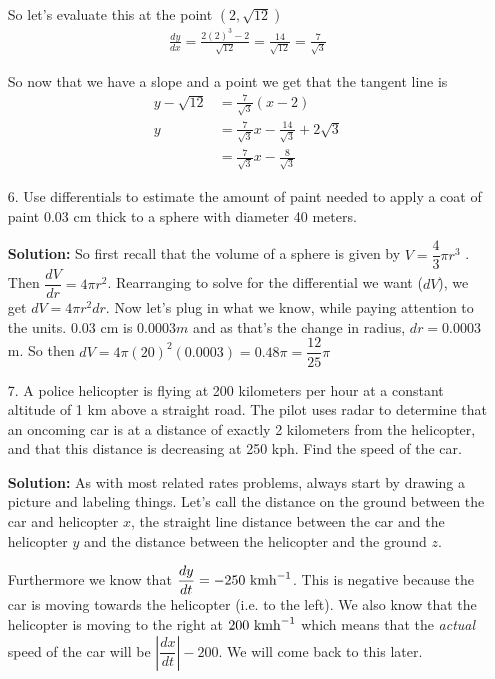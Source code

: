 \documentclass[11pt,reqno]{article}
\theoremstyle{definition}
\begin{document}
\begin{enumerate}
		So let's evaluate this at the point $(2, \sqrt{12})$ 
		\begin{align*}
			\frac{dy}{dx} = \frac{2 (2)^3 - 2}{\sqrt{12}} = \frac{14}{\sqrt{12}} = \frac{7}{\sqrt{3}}
		\end{align*}
		
		So now that we have a slope and a point we get that the tangent line is
		\begin{align*}
			y - \sqrt{12} &= \frac{7}{\sqrt{3}} (x - 2) \\
			y &= \frac{7}{\sqrt{3}} x - \frac{14}{\sqrt{3}} + 2\sqrt{3} \\
			  &= \frac{7}{\sqrt{3}} x -\frac{8}{\sqrt{3}}
		\end{align*}
		
		\item[6.] Use differentials to estimate the amount of paint needed to apply a coat of paint 0.03 cm thick to a sphere with diameter 40 meters.
		
		\textbf{Solution:} So first recall that the volume of a sphere is given by $V = \dfrac{4}{3} \pi r^3$ . Then $\dfrac{dV}{dr} = 4 \pi r^2$. Rearranging to solve for the differential we want ($dV$), we get $dV = 4 \pi r^2 dr$. Now let's plug in what we know, while paying attention to the units. $0.03$ cm is $0.0003 m$ and as that's the change in radius, $dr =  0.0003$ m. So then $dV = 4 \pi (20)^2 (0.0003) = 0.48 \pi = \dfrac{12}{25} \pi$
		\newpage
		\item[7.] A police helicopter is flying at 200 kilometers per hour at a constant altitude of 1 km above a straight road. The pilot uses radar to determine that an oncoming car is at a distance of exactly 2 kilometers from the helicopter, and that this distance is decreasing at 250 kph. Find the speed of the car.
		
		\textbf{Solution:} As with most related rates problems, always start by drawing a picture and labeling things. Let's call the distance on the ground between the car and helicopter $x$, the straight line distance between the car and the helicopter $y$ and the distance between the helicopter and the ground $z$. 
		
		
		Furthermore we know that $\dfrac{dy}{dt} = - 250 \textnormal{ kmh}^{-1}$. This is negative because the car is moving towards the helicopter (i.e. to the left). We also know that the helicopter is moving to the right at $200 \textnormal{ kmh}^{-1}$ which means that the \emph{actual} speed of the car will be $\left|\dfrac{dx}{dt}\right| - 200$. We will come back to this later. 
		

\end{enumerate}
\end{document}
